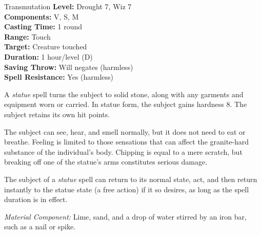 {Transmutation}
{
	\textbf{Level:}
	Drought 7, Wiz 7\\
	\textbf{Components:}
	V, S, M\\
	\textbf{Casting Time:}
	1 round\\
	\textbf{Range:}
	Touch\\
	\textbf{Target:}
	Creature touched\\
	\textbf{Duration:}
	1 hour/level (D)\\
	\textbf{Saving Throw:}
	Will negates (harmless)\\
	\textbf{Spell Resistance:}
	Yes (harmless)\\
}
{
	A \emph{statue} spell turns the subject to solid stone, along with any garments and equipment worn or carried. In statue form, the subject gains hardness 8. The subject retains its own hit points.

	The subject can see, hear, and smell normally, but it does not need to eat or breathe. Feeling is limited to those sensations that can affect the granite-hard substance of the individual's body. Chipping is equal to a mere scratch, but breaking off one of the statue's arms constitutes serious damage.

	The subject of a \emph{statue} spell can return to its normal state, act, and then return instantly to the statue state (a free action) if it so desires, as long as the spell duration is in effect.

	\textit{Material Component:}
	Lime, sand, and a drop of water stirred by an iron bar, such as a nail or spike.

}

